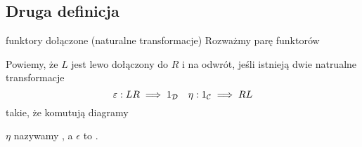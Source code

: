 
\subsection{Druga definicja}

\begin{definition}{funktory dołączone (naturalne transformacje)}{}
  Rozważmy parę funktorów
  \begin{center}
  \end{center}
  Powiemy, że $L$ jest lewo dołączony do $R$ i na odwrót, jeśli istnieją dwie natrualne transformacje
  $$\varepsilon:LR\implies 1_{\mathcal{D}} \quad \eta:1_{\mathcal{C}}\implies RL$$
  takie, że komutują diagramy
  \begin{center}
  \end{center}
  $\eta$ nazywamy , a $\epsilon$ to .
\end{definition}

%
%
%
%



